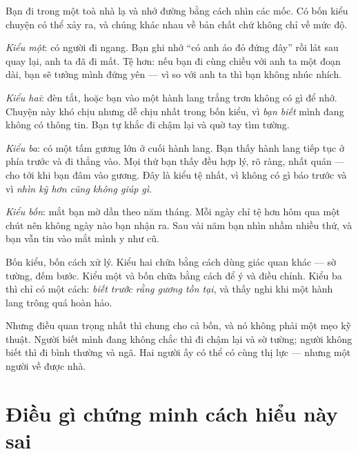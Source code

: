 \documentclass[../../vslam.tex]{subfiles}
\begin{document}
\begin{dongian}
Bạn đi trong một toà nhà lạ và nhớ đường bằng cách nhìn các mốc. Có bốn kiểu chuyện có thể xảy ra, và chúng khác nhau về bản chất chứ không chỉ về mức độ.

\emph{Kiểu một}: có người đi ngang. Bạn ghi nhớ ``có anh áo đỏ đứng đây'' rồi lát sau quay lại, anh ta đã đi mất. Tệ hơn: nếu bạn đi cùng chiều với anh ta một đoạn dài, bạn sẽ tưởng mình đứng yên --- vì so với anh ta thì bạn không nhúc nhích.

\emph{Kiểu hai}: đèn tắt, hoặc bạn vào một hành lang trắng trơn không có gì để nhớ. Chuyện này khó chịu nhưng dễ chịu nhất trong bốn kiểu, vì \emph{bạn biết} mình đang không có thông tin. Bạn tự khắc đi chậm lại và quờ tay tìm tường.

\emph{Kiểu ba}: có một tấm gương lớn ở cuối hành lang. Bạn thấy hành lang tiếp tục ở phía trước và đi thẳng vào. Mọi thứ bạn thấy đều hợp lý, rõ ràng, nhất quán --- cho tới khi bạn đâm vào gương. Đây là kiểu tệ nhất, vì không có gì báo trước và vì \emph{nhìn kỹ hơn cũng không giúp gì}.

\emph{Kiểu bốn}: mắt bạn mờ dần theo năm tháng. Mỗi ngày chỉ tệ hơn hôm qua một chút nên không ngày nào bạn nhận ra. Sau vài năm bạn nhìn nhầm nhiều thứ, và bạn vẫn tin vào mắt mình y như cũ.

Bốn kiểu, bốn cách xử lý. Kiểu hai chữa bằng cách dùng giác quan khác --- sờ tường, đếm bước. Kiểu một và bốn chữa bằng cách để ý và điều chỉnh. Kiểu ba thì chỉ có một cách: \emph{biết trước rằng gương tồn tại}, và thấy nghi khi một hành lang trông quá hoàn hảo.

Nhưng điều quan trọng nhất thì chung cho cả bốn, và nó không phải một mẹo kỹ thuật. Người biết mình đang không chắc thì đi chậm lại và sờ tường; người không biết thì đi bình thường và ngã. Hai người ấy có thể có cùng thị lực --- nhưng một người về được nhà.

\end{dongian}

\section{Điều gì chứng minh cách hiểu này sai}
\end{document}
